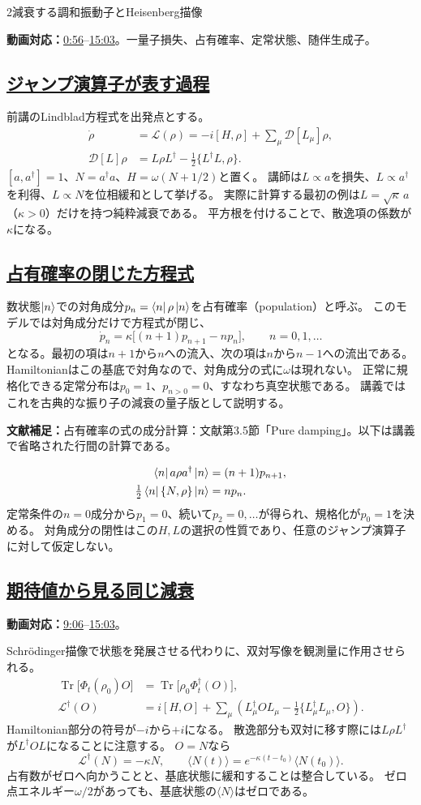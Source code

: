 \documentclass[a4paper,11pt]{ltjsarticle}
\newcommand{\subsectionlink}[1]{\subsection[#1]{\hyperlink{toc}{#1}}}
\numberwithin{equation}{section}
\newcommand{\Tr}{\operatorname{Tr}}
\newcommand{\Diss}{\mathcal{D}}
\newcommand{\av}[1]{\langle #1\rangle}
\newcommand{\video}[2]{\href{https://www.youtube.com/watch?v=RYxzcUhIHjk\&t=#1s}{#2}}
\newcommand{\videosource}[1]{\par\noindent\textcolor{noteblue}{\textbf{動画対応：}#1}\par\smallskip}
\newcommand{\supplement}[1]{\par\medskip\noindent\textcolor{notered}{\textbf{文献補足：}}#1\par\smallskip}
\begin{document}
\begin{lecturesection}{2}{減衰する調和振動子とHeisenberg描像}
\label{sec:damping}
\videosource{\video{56}{0:56}--\video{903}{15:03}。一量子損失、占有確率、定常状態、随伴生成子。}
\subsectionlink{ジャンプ演算子が表す過程}
前講のLindblad方程式を出発点とする。
\begin{align}
 \dot\rho&=\mathcal L(\rho)=-i[H,\rho]+\sum_\mu\Diss[L_\mu]\rho,
 \label{eq:lindblad}\\
 \Diss[L]\rho&=L\rho L^\dagger-\frac12\{L^\dagger L,\rho\}.
\end{align}
$[a,a^\dagger]=1$、$N=a^\dagger a$、$H=\omega(N+1/2)$と置く。
講師は$L\propto a$を損失、$L\propto a^\dagger$を利得、$L\propto N$を位相緩和として挙げる。
実際に計算する最初の例は$L=\sqrt\kappa\,a$（$\kappa>0$）だけを持つ純粋減衰である。
平方根を付けることで、散逸項の係数が$\kappa$になる。

\subsectionlink{占有確率の閉じた方程式}
数状態$\ket n$での対角成分$p_n=\bra n\rho\ket n$を占有確率（population）と呼ぶ。
このモデルでは対角成分だけで方程式が閉じ、
\begin{equation}
 \dot p_n=\kappa\bigl[(n+1)p_{n+1}-np_n\bigr],\qquad n=0,1,\ldots
 \label{eq:pauli}
\end{equation}
となる。最初の項は$n+1$から$n$への流入、次の項は$n$から$n-1$への流出である。
Hamiltonianはこの基底で対角なので、対角成分の式に$\omega$は現れない。
正常に規格化できる定常分布は$p_0=1$、$p_{n>0}=0$、すなわち真空状態である。
講義ではこれを古典的な振り子の減衰の量子版として説明する。

\supplement{占有確率の式の成分計算：文献\cite{Pajer:2026fuo}第3.5節「Pure damping」。以下は講義で省略された行間の計算である。}
\begin{align}
 \bra n a\rho a^\dagger\ket n&=(n+1)p_{n+1},\\
 \tfrac12\bra n\{N,\rho\}\ket n&=np_n.
\end{align}
定常条件の$n=0$成分から$p_1=0$、続いて$p_2=0,\ldots$が得られ、規格化が$p_0=1$を決める。
対角成分の閉性はこの$H,L$の選択の性質であり、任意のジャンプ演算子に対して仮定しない。

\subsectionlink{期待値から見る同じ減衰}
\videosource{\video{546}{9:06}--\video{903}{15:03}。}
Schr\"odinger描像で状態を発展させる代わりに、双対写像を観測量に作用させられる。
\begin{align}
 \Tr\bigl[\Phi_t(\rho_0)O\bigr]
   &=\Tr\bigl[\rho_0\Phi_t^\dagger(O)\bigr],\\
 \mathcal L^\dagger(O)
   &=i[H,O]+\sum_\mu\left(L_\mu^\dagger O L_\mu
       -\frac12\{L_\mu^\dagger L_\mu,O\}\right).
 \label{eq:dual}
\end{align}
Hamiltonian部分の符号が$-i$から$+i$になる。
散逸部分も双対に移す際には$L\rho L^\dagger$が$L^\dagger O L$になることに注意する。
$O=N$なら
\begin{equation}
 \mathcal L^\dagger(N)=-\kappa N,\qquad
 \av{N(t)}=e^{-\kappa(t-t_0)}\av{N(t_0)}.
 \label{eq:decayN}
\end{equation}
占有数がゼロへ向かうことと、基底状態に緩和することは整合している。
ゼロ点エネルギー$\omega/2$があっても、基底状態の$\av N$はゼロである。


\end{lecturesection}
\end{document}
